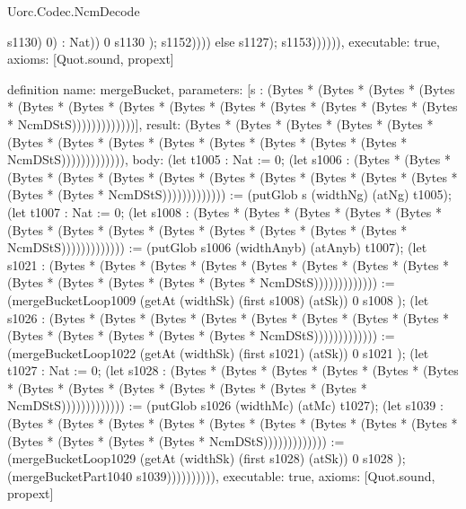 \begin{lexlean}{Uorc.Codec.NcmDecode}
\begin{semanticmodule}
{s1130) 0) : Nat)) 0 s1130 ); s1152)))) else s1127); s1153)))))),
  executable: true,
  axioms: [Quot.sound, propext]
}

definition{
  name: mergeBucket,
  parameters: [s : (Bytes * (Bytes * (Bytes * (Bytes * (Bytes * (Bytes * (Bytes * (Bytes * (Bytes * (Bytes * (Bytes * (Bytes * (Bytes * NcmDStS)))))))))))))],
  result: (Bytes * (Bytes * (Bytes * (Bytes * (Bytes * (Bytes * (Bytes * (Bytes * (Bytes * (Bytes * (Bytes * (Bytes * (Bytes * NcmDStS))))))))))))),
  body: (let t1005 : Nat := 0; (let s1006 : (Bytes * (Bytes * (Bytes * (Bytes * (Bytes * (Bytes * (Bytes * (Bytes * (Bytes * (Bytes * (Bytes * (Bytes * (Bytes * NcmDStS))))))))))))) := (putGlob s (widthNg) (atNg) t1005); (let t1007 : Nat := 0; (let s1008 : (Bytes * (Bytes * (Bytes * (Bytes * (Bytes * (Bytes * (Bytes * (Bytes * (Bytes * (Bytes * (Bytes * (Bytes * (Bytes * NcmDStS))))))))))))) := (putGlob s1006 (widthAnyb) (atAnyb) t1007); (let s1021 : (Bytes * (Bytes * (Bytes * (Bytes * (Bytes * (Bytes * (Bytes * (Bytes * (Bytes * (Bytes * (Bytes * (Bytes * (Bytes * NcmDStS))))))))))))) := (mergeBucketLoop1009 (getAt (widthSk) (first s1008) (atSk)) 0 s1008 ); (let s1026 : (Bytes * (Bytes * (Bytes * (Bytes * (Bytes * (Bytes * (Bytes * (Bytes * (Bytes * (Bytes * (Bytes * (Bytes * (Bytes * NcmDStS))))))))))))) := (mergeBucketLoop1022 (getAt (widthSk) (first s1021) (atSk)) 0 s1021 ); (let t1027 : Nat := 0; (let s1028 : (Bytes * (Bytes * (Bytes * (Bytes * (Bytes * (Bytes * (Bytes * (Bytes * (Bytes * (Bytes * (Bytes * (Bytes * (Bytes * NcmDStS))))))))))))) := (putGlob s1026 (widthMc) (atMc) t1027); (let s1039 : (Bytes * (Bytes * (Bytes * (Bytes * (Bytes * (Bytes * (Bytes * (Bytes * (Bytes * (Bytes * (Bytes * (Bytes * (Bytes * NcmDStS))))))))))))) := (mergeBucketLoop1029 (getAt (widthSk) (first s1028) (atSk)) 0 s1028 ); (mergeBucketPart1040 s1039)))))))))),
  executable: true,
  axioms: [Quot.sound, propext]
}


\end{semanticmodule}
\end{lexlean}
